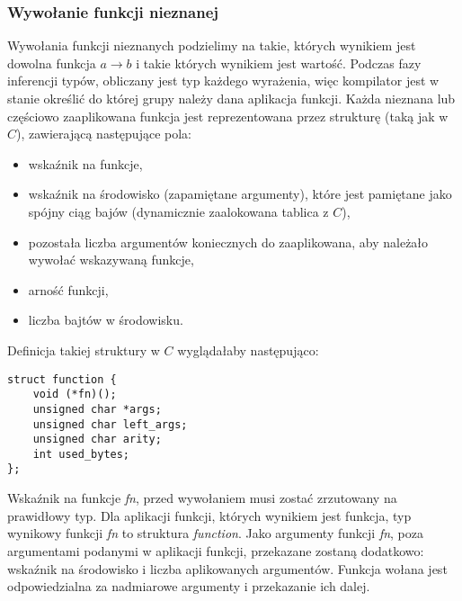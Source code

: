 \documentclass[declaration,shortabstract]{iithesis}
\begin{document}
\subsubsection{Wywołanie funkcji nieznanej}

Wywołania funkcji nieznanych podzielimy na takie, których wynikiem jest dowolna
funkcja $ a \rightarrow b $ i takie których wynikiem jest wartość. Podczas
fazy inferencji typów, obliczany jest typ każdego wyrażenia, więc kompilator
jest w stanie określić do której grupy należy dana aplikacja funkcji. Każda 
nieznana lub częściowo zaaplikowana funkcja jest reprezentowana przez strukturę 
(taką jak w $C$), 
zawierającą następujące pola:

\begin{itemize}
  \item wskaźnik na funkcje,
  \item wskaźnik na środowisko (zapamiętane argumenty), które jest pamiętane 
  jako spójny ciąg bajów (dynamicznie zaalokowana tablica z $C$),
  \item pozostała liczba argumentów koniecznych do zaaplikowana, aby należało 
  wywołać wskazywaną funkcje,
  \item arność funkcji,
  \item liczba bajtów w środowisku.
\end{itemize}

Definicja takiej struktury w $C$ wyglądałaby następująco:

\begin{lstlisting}[frame=single, caption=Rozwinięta funkcja w OCamlu.]
struct function {
    void (*fn)();
    unsigned char *args;
    unsigned char left_args;
    unsigned char arity;
    int used_bytes;   
};
\end{lstlisting}

Wskaźnik na funkcje \textit{fn}, przed wywołaniem musi zostać zrzutowany na 
prawidłowy typ. Dla aplikacji funkcji, których wynikiem jest funkcja, typ 
wynikowy funkcji \textit{fn} to struktura \textit{function}. Jako argumenty 
funkcji \textit{fn}, poza argumentami podanymi w aplikacji funkcji, przekazane 
zostaną dodatkowo: wskaźnik na środowisko i liczba aplikowanych argumentów.
Funkcja wołana jest odpowiedzialna za nadmiarowe argumenty i przekazanie ich 
dalej.
\end{document}
